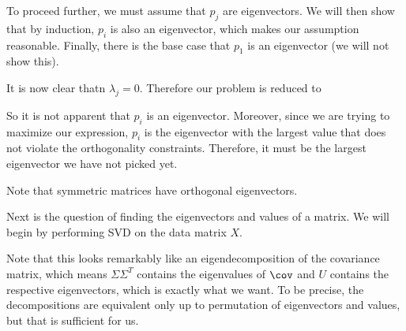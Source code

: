 \documentclass[12pt]{article}
\begin{document}

To proceed further, we must assume that $p_j$ are eigenvectors. We will then show that by induction, $p_i$ is also an eigenvector, which makes our assumption reasonable. Finally, there is the base case that $p_1$ is an eigenvector (we will not show this).


It is now clear thatn $\lambda_j = 0$. Therefore our problem is reduced to


So it is not apparent that $p_i$ is an eigenvector. Moreover, since we are trying to maximize our expression, $p_i$ is the eigenvector with the largest value that does not violate the orthogonality constraints. Therefore, it must be the largest eigenvector we have not picked yet.

Note that symmetric matrices have orthogonal eigenvectors. 

Next is the question of finding the eigenvectors and values of a matrix. We will begin by performing SVD on the data matrix $X$.


Note that this looks remarkably like an eigendecomposition of the covariance matrix, which means $\Sigma \Sigma^T$ contains the eigenvalues of $\cov$ and $U$ contains the respective eigenvectors, which is exactly what we want. To be precise, the decompositions are equivalent only up to permutation of eigenvectors and values, but that is sufficient for us.
\end{document}
